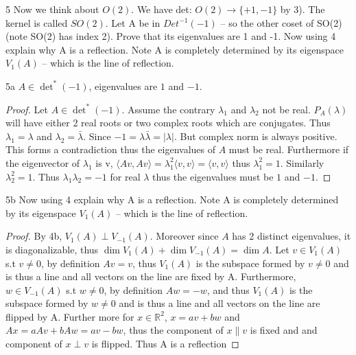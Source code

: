 \documentclass{article}
\newcommand{\R}{\mathbb{R}}
\newcommand{\abs}[1]{\lvert #1\rvert}
\newcommand{\angles}[1]{\langle{#1}\rangle}
\begin{document}
\bigskip

\begin{PROB}{5}\label{Problem 5.}
    Now we think about $O(2)$. We have det: $O(2) \to \{+1,-1\}$ by 3).  The kernel is called $SO(2)$. Let A be in $Det^{-1}(-1)$ -- so the other coset of SO(2) (note SO(2) has index 2). Prove that its eigenvalues are 1 and -1. Now using 4 explain why A is a reflection. Note A is completely determined by its eigenspace $V_1(A)$ -- which is the line of reflection. 
\end{PROB}

\begin{claim}{5a}
    $A \in \det^*(-1)$, eigenvalues are $1$ and $-1$.
\end{claim}
\begin{proof}
    Let $A \in \det^*(-1)$. Assume the contrary $\lambda_1$ and $\lambda_2$ not be real. $P_A(\lambda)$ will have either 2 real roots or two complex roots which are conjugates. Thus $\lambda_1 =\lambda$ and $\lambda_2 = \bar \lambda$. Since $-1 = \lambda \bar \lambda = \abs{\lambda}$. But complex norm is always positive. This forms a contradiction thus the eigenvalues of $A$ must be real. Furthermore if the eigenvector of $\lambda_1$ is v, $\angles{Av, Av} = \lambda_1^2 \angles{v, v} = \angles{v, v}$ thus $\lambda_1^2 = 1$. Similarly $\lambda_2^2 = 1$. Thus $\lambda_1 \lambda_2 = -1$ for real $\lambda$ thus the eigenvalues must be $1$ and $-1$.
    
\end{proof}

\begin{claim}{5b}
    Now using 4 explain why A is a reflection. Note A is completely determined by its eigenspace $V_1(A)$ -- which is the line of reflection. 
\end{claim}
\begin{proof}

    By 4b, $V_1(A) \perp V_{-1}(A)$. Moreover since $A$ has 2 distinct eigenvalues, it is diagonalizable, thus $\dim V_1(A) + \dim V_{-1}(A) = \dim A$. Let $v \in V_1(A)$ s.t $v \neq 0$, by definition $Av = v$, thus $V_1(A)$ is the subspace formed by $v \neq 0$ and is thus a line and all vectors on the line are fixed by A. Furthermore, $w \in V_{-1}(A)$ s.t $w \neq 0$, by definition $Aw = -w$, and thus $V_1(A)$ is the subspace formed by $w \neq 0$ and is thus a line and all vectors on the line are flipped by A. Further more for $x \in \R^2$, $x = av + bw$ and $Ax = aAv + bAw = av - bw$, thus the component of $x \parallel v$ is fixed and and component of $x \perp v$ is flipped. Thus A is a reflection

\end{proof}
\end{document}
